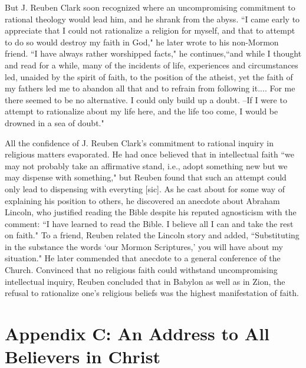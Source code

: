 \documentclass{article}
\begin{document}
But J. Reuben Clark soon recognized where an uncompromising commitment to 
rational theology would lead him, and he shrank from the abyss. 
``I came early to appreciate that I could not rationalize a religion for myself, 
and that to attempt to do so would destroy my faith in God," 
he later wrote to his non-Mormon friend. ``I have always rather worshipped 
facts," he continues,``and while I thought and read for a while, many of the 
incidents of life, experiences and circumstances led, unaided by the spirit of 
faith, to the position of the atheist, yet the faith of my fathers led me to 
abandon all that and to refrain from following it.... For me there seemed to be 
no alternative. I could only build up a doubt. --If I were to attempt to 
rationalize about my life here, and the life too come, I would be drowned in 
a sea of doubt."

All the confidence of J. Reuben Clark's commitment to rational inquiry in 
religious matters evaporated. He had once believed that in intellectual faith 
``we may not probably take an affirmative stand, i.e., adopt something new but 
we may dispense with something," but Reuben found that such an attempt could 
only lead to dispensing with everyting [sic]. As he cast about for some way of 
explaining his position to others, he discovered an anecdote about Abraham 
Lincoln, who justified reading the Bible despite his reputed agnosticism with 
the comment: ``I have learned to read the Bible. I believe all I can and take 
the rest on faith." To a friend, Reuben related the Lincoln story and added, 
``Substituting in the substance the words `our Mormon Scriptures,' you will 
have about my situation." He later commended that anecdote to a general 
conference of the Church. Convinced that no religious faith could withstand 
uncompromising intellectual inquiry, Reuben concluded that in Babylon as well 
as in Zion, the refusal to rationalize one's religious beliefs was the highest 
manifestation of faith.

\cite{clark}

\newpage

\section{Appendix C: An Address to All Believers in Christ}
\end{document}
